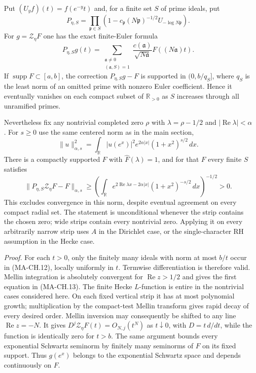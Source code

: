 Put $(U_y f)(t)=f(e^{-y}t)$ and, for a finite set $S$ of
prime ideals, put
\[
 P_{\eta,S}=\prod_{\mathfrak p\in S}
  \left(1-c_{\mathfrak p}(N\mathfrak p)^{-1/2}
                                      U_{-\log N\mathfrak p}\right).
 \tag{MA-CH.14}
\]
For $g=\mathcal Z_\eta F$ one has the exact finite-Euler formula
\[
       P_{\eta,S}g(t)=
       \sum_{\substack{\mathfrak a\ne0\\(\mathfrak a,S)=1}}
            \frac{c(\mathfrak a)}{\sqrt{N\mathfrak a}}
                                     F((N\mathfrak a)t).
 \tag{MA-CH.15}
\]
If $\operatorname{supp}F\subset[a,b]$, the correction
$P_{\eta,S}g-F$ is supported in $(0,b/q_S]$, where $q_S$
is the least norm of an omitted prime with nonzero Euler
coefficient.  Hence it eventually vanishes on each compact
subset of $\mathbb R_{>0}$ as $S$ increases through all
unramified primes.

Nevertheless fix any nontrivial completed zero $\rho$ with
$\lambda=\rho-1/2$ and $|\operatorname{Re}\lambda|<\alpha$.
For $s\ge0$ use the same centered norm as in the main section,
\[
 \|u\|_{\alpha,s}^2=
  \int_{\mathbb R}|u(e^x)|^2e^{2\alpha|x|}(1+x^2)^{s/2}\,dx.
 \tag{MA-CH.16}
\]
There is a compactly supported $F$ with $\widehat F(\lambda)=1$,
and for that $F$ every finite $S$ satisfies
\[
 \|P_{\eta,S}\mathcal Z_\eta F-F\|_{\alpha,s}
   \ge
   \left(\int_{\mathbb R}
        e^{2\operatorname{Re}\lambda x-2\alpha|x|}
                          (1+x^2)^{-s/2}\,dx\right)^{-1/2}>0.
 \tag{MA-CH.17}
\]
This excludes convergence in this norm, despite eventual
agreement on every compact radial set.  The statement is
unconditional whenever the strip contains the chosen zero;
wide strips contain every nontrivial zero.  Applying it on
every arbitrarily narrow strip uses $A$ in the Dirichlet case,
or the single-character RH assumption in the Hecke case.

\emph{Proof.}
For each $t>0$, only the finitely many ideals with norm at
most $b/t$ occur in (MA-CH.12), locally uniformly in $t$.
Termwise differentiation is therefore valid.  Mellin
integration is absolutely convergent for
$\operatorname{Re}z>1/2$ and gives the first equation in
(MA-CH.13).  The finite Hecke $L$-function is entire in
the nontrivial cases considered here.  On each fixed
vertical strip it has at most polynomial growth; multiplication
by the compact-test Mellin transform gives rapid decay of
every desired order.  Mellin inversion may consequently
be shifted to any line $\operatorname{Re}z=-N$.
It gives $D^j\mathcal Z_\eta F(t)=O_{N,j}(t^N)$ as
$t\downarrow0$, with $D=t\,d/dt$, while the function is
identically zero for $t>b$.  The same argument bounds every
exponential Schwartz seminorm by finitely many seminorms of
$F$ on its fixed support.  Thus $g(e^x)$ belongs to the
exponential Schwartz space and depends continuously on $F$.

